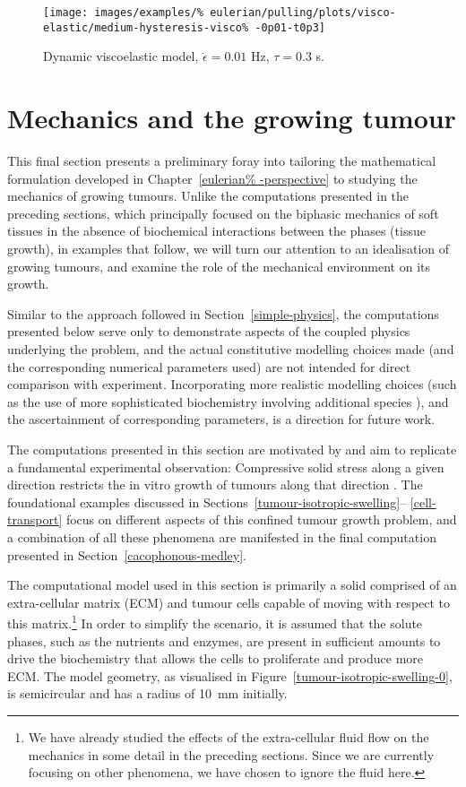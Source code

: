 \begin{figure}[!hptb]
  \centering
  \texttt{[image: images/examples/\%
    eulerian/pulling/plots/visco-elastic/medium-hysteresis-visco\%
    -0p01-t0p3]}
  \caption{Dynamic viscoelastic model, $\dot{\epsilon}=0.01$ Hz,
    $\tau=0.3$ s.}
  \label{medium-hysteresis-visco-0p01-t0p3}
\end{figure}

\section{Mechanics and the growing tumour}
\label{tumour-growth}

This final section presents a preliminary foray into tailoring the
mathematical formulation developed in Chapter~\ref{eulerian%
  -perspective} to studying the mechanics of growing tumours. Unlike
the computations presented in the preceding sections, which
principally focused on the biphasic mechanics of soft tissues in the
absence of biochemical interactions between the phases (tissue
growth), in examples that follow, we will turn our attention to an
idealisation of growing tumours, and examine the role of the
mechanical environment on its growth.

Similar to the approach followed in Section~\ref{simple-physics}, the
computations presented below serve only to demonstrate aspects of the
coupled physics underlying the problem, and the actual constitutive
modelling choices made (and the corresponding numerical parameters
used) are not intended for direct comparison with experiment.
Incorporating more realistic modelling choices (such as the use of
more sophisticated biochemistry involving additional species
\citep{tjacks2000}), and the ascertainment of corresponding
parameters, is a direction for future work.

The computations presented in this section are motivated by and aim to
replicate a fundamental experimental observation: Compressive solid
stress along a given direction restricts the in vitro growth of
tumours along that direction \citep{jain1997}. The foundational
examples discussed in Sections~\ref{tumour-isotropic-swelling}--%
\ref{cell-transport} focus on different aspects of this confined
tumour growth problem, and a combination of all these phenomena are
manifested in the final computation presented in
Section~\ref{cacophonous-medley}.

The computational model used in this section is primarily a solid
comprised of an extra-cellular matrix (ECM) and tumour cells capable
of moving with respect to this matrix.\footnote{We have already
  studied the effects of the extra-cellular fluid flow on the
  mechanics in some detail in the preceding sections. Since we are
  currently focusing on other phenomena, we have chosen to ignore the
  fluid here.} In order to simplify the scenario, it is assumed that
the solute phases, such as the nutrients and enzymes, are present in
sufficient amounts to drive the biochemistry that allows the cells to
proliferate and produce more ECM. The model geometry, as visualised in
Figure~\ref{tumour-isotropic-swelling-0}, is semicircular and has a
radius of 10~mm initially.

